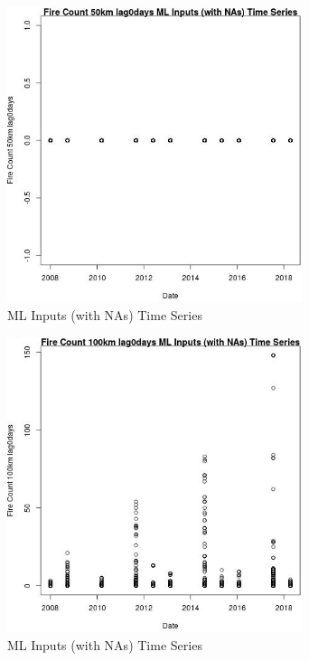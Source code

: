 \begin{figure} 
\centering  
\includegraphics[width=0.77\textwidth]{Code_Outputs/Report_ML_input_PM25_Step4_part_e_de_duplicated_aves_compiled_2019-05-18wNAs_Fire_Count_50km_lag0daysvDate.jpg} 
\caption{\label{fig:Report_ML_input_PM25_Step4_part_e_de_duplicated_aves_compiled_2019-05-18wNAsFire_Count_50km_lag0daysvDate}ML Inputs (with NAs) Time Series} 
\end{figure} 
 

\clearpage 

\begin{figure} 
\centering  
\includegraphics[width=0.77\textwidth]{Code_Outputs/Report_ML_input_PM25_Step4_part_e_de_duplicated_aves_compiled_2019-05-18wNAs_Fire_Count_100km_lag0daysvDate.jpg} 
\caption{\label{fig:Report_ML_input_PM25_Step4_part_e_de_duplicated_aves_compiled_2019-05-18wNAsFire_Count_100km_lag0daysvDate}ML Inputs (with NAs) Time Series} 
\end{figure} 
 

